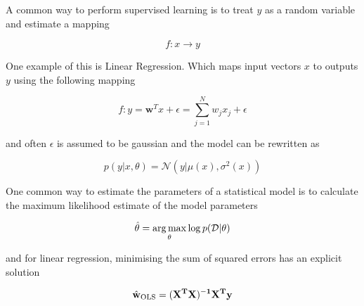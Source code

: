 {A common way to perform supervised learning is to treat  $y$ as a random variable and estimate a mapping 

\begin{equation}
    f: x \rightarrow y
\end{equation}

One example of this is Linear Regression. Which maps input vectors $x$ to outputs $y$ using the following mapping \cite[p.~19]{murphy2012machine}

\begin{equation}
    f: y = \mathbf{w}^Tx + \epsilon = \sum_{j=1}^N w_j x_j + \epsilon
\end{equation}

and often $\epsilon$ is assumed to be gaussian and the model can be rewritten as 

\begin{equation}
    p(y|x, \theta) = \mathcal{N}(y|\mu(x), \sigma^2(x))
\end{equation}

One common way to estimate the parameters of a statistical model is to calculate the maximum likelihood estimate of the model parameters \cite[p.~217]{murphy2012machine}

\begin{equation}
    \hat{\mathbf{\theta}} = \operatorname*{arg\,max}_{\theta} \log p(\mathcal{D}|\theta)
\end{equation}

and for linear regression, minimising the sum of squared errors has an explicit solution \cite[p.~220]{murphy2012machine}

\begin{equation}
    \hat{\bf{w}}_{\text{OLS}} = (\bf{X}^T\bf{X})^{-1}\bf{X}^T\bf{y}
\end{equation}


}
